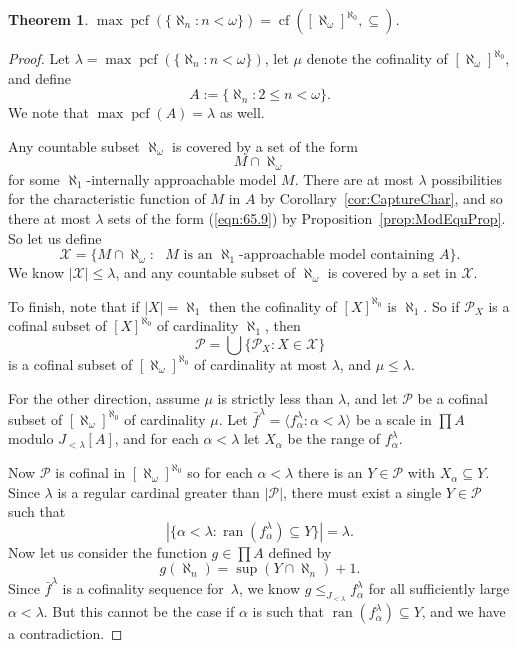 \documentclass[10pt]{amsart}
\theoremstyle{plain}
\newtheorem{theorem}{Theorem}
\theoremstyle{definition}
\theoremstyle{remark}
\DeclareMathOperator{\ran}{ran}
\DeclareMathOperator{\cf}{cf}
\DeclareMathOperator{\pcf}{pcf}
\numberwithin{equation}{section}
\begin{document}
\begin{theorem}
$\max\pcf(\{\aleph_n:n<\omega\}) = \cf\left([\aleph_\omega]^{\aleph_0},\subseteq\right)$.
\end{theorem}
\begin{proof}
Let $\lambda = \max\pcf(\{\aleph_n:n<\omega\})$, let $\mu$ denote the cofinality of $[\aleph_\omega]^{\aleph_0}$, and define
\begin{equation}
A:=\{\aleph_n:2\leq n<\omega\}.
\end{equation}
We note that $\max\pcf(A)=\lambda$ as well.


Any countable subset $\aleph_\omega$ is covered by a set of the form
\begin{equation}
\label{eqn:65.9}
M\cap\aleph_\omega
\end{equation}
for some $\aleph_1$-internally approachable model $M$.  There are at most $\lambda$ possibilities for the characteristic function
of $M$ in $A$ by Corollary~\ref{cor:CaptureChar}, and so there at most $\lambda$ sets of the form (\ref{eqn:65.9}) by
Proposition~\ref{prop:ModEquProp}.   So let us define
\begin{equation}
\mathcal{X} = \{M\cap\aleph_{\omega}:\text{ $M$ is an $\aleph_1$-approachable model containing $A$}\}.
\end{equation}
We know $|\mathcal{X}|\leq\lambda$, and any countable subset of $\aleph_\omega$ is covered by a set in $\mathcal{X}$.

To finish, note that if $|X|=\aleph_1$ then the cofinality of $[X]^{\aleph_0}$ is $\aleph_1$. So if $\mathcal{P}_X$ is a cofinal
subset of $[X]^{\aleph_0}$ of cardinality $\aleph_1$, then
\begin{equation}
\mathcal{P} = \bigcup\{\mathcal{P}_X: X\in\mathcal{X}\}
\end{equation}
is a cofinal subset of $[\aleph_\omega]^{\aleph_0}$ of cardinality at most $\lambda$, and $\mu\leq\lambda$.


For the other direction, assume $\mu$ is strictly less than $\lambda$, and let $\mathcal{P}$ be a cofinal subset of
$[\aleph_\omega]^{\aleph_0}$ of cardinality $\mu$.  Let $\bar{f}^\lambda=\langle f^\lambda_\alpha:\alpha<\lambda\rangle$ be a
scale in $\prod A$ modulo $J_{<\lambda}[A]$, and for each $\alpha<\lambda$ let $X_\alpha$ be the range of $f^\lambda_\alpha$.

Now $\mathcal{P}$ is cofinal in $[\aleph_\omega]^{\aleph_0}$ so for each $\alpha<\lambda$ there is an $Y\in\mathcal{P}$ with
$X_\alpha\subseteq Y$.  Since $\lambda$ is a regular cardinal greater than $|\mathcal{P}|$, there must exist a single
$Y\in\mathcal{P}$ such that
\begin{equation}
|\{\alpha<\lambda:\ran(f^\lambda_\alpha)\subseteq Y\}|=\lambda.
\end{equation}
Now let us consider the function $g\in\prod A$ defined by
\begin{equation}
g(\aleph_n) = \sup(Y\cap\aleph_n)+1.
\end{equation}
Since $\bar{f}^\lambda$ is a cofinality sequence for~$\lambda$, we know $g\leq_{J_{<\lambda}}f^\lambda_\alpha$ for all sufficiently large $\alpha<\lambda$.
But this cannot be the case if $\alpha$ is such that $\ran(f^\lambda_\alpha)\subseteq Y$, and we have a contradiction.


\end{proof}
\end{document}
